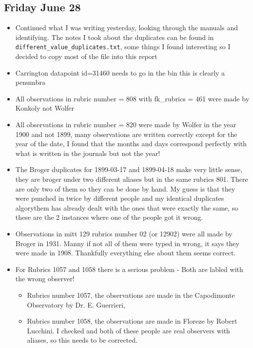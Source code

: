 \documentclass[12pt]{article}
\begin{document}
\subsection{Friday June 28} 
\begin{itemize}
    \item Continued what I was writing yesterday, looking through the manuals and identifying. The notes I took about the duplicates can be found in \texttt{different\_value\_duplicates.txt}, some things I found interesting so I decided to copy most of the file into this report
    \item Carrington datapoint id=31460 needs to go in the bin this is clearly a penumbra
    \item All observations in rubric number = 808 with fk\_rubrics = 461 were made by Konkoly not Wolfer
    \item All observations in rubric number = 820 were made by Wolfer in the year 1900 and not 1899, many observations are written correctly except for the year of the date, I found that the months and days correspond perfectly with what is written in the journals but not the year!
    \item The Broger duplicates for 1899-03-17 and 1899-04-18 make very little sense, they are broger under two different aliases but in the same rubrics 801. There are only two of them so they can be done by hand. My guess is that they were punched in twice by different people and my identical duplicates algorythem has already dealt with the ones that were exactly the same, so these are the 2 instances where one of the people got it wrong.
    \item Observations in mitt 129 rubrics number 02 (or 12902) were all made by Broger in 1931. Manny if not all of them were typed in wrong, it says they were made in 1908. Thankfully everything else about them seems correct.
    \item For Rubrics 1057 and 1058 there is a serious problem - Both are labled with the wrong observer! 
    \begin{itemize}
        \item Rubrics number 1057, the observations are made in the Capodimonte Observatory by Dr. E. Guerrieri,
        \item Rubrics number 1058, the observations are made in Floreze by Robert Lucchini. I checked and both of these people are real observers with aliases, so this needs to be corrected.

\end{itemize}
\end{itemize}
\end{document}

